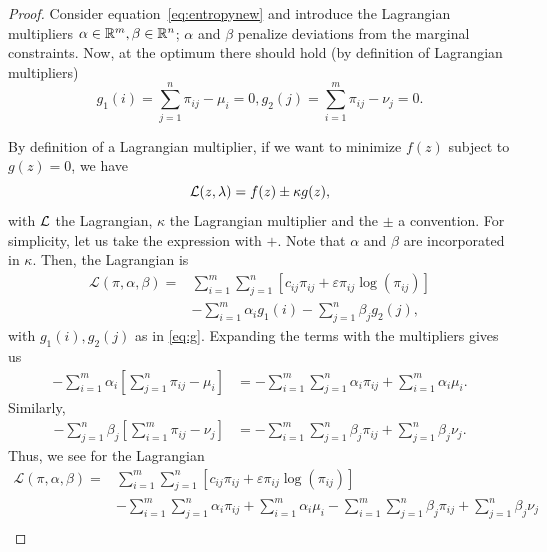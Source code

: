 \begin{proof}
	Consider equation~\eqref{eq:entropynew} and introduce the Lagrangian multipliers $\alpha \in \mathbb{R}^m, \beta\in \mathbb{R}^n$; $\alpha$ and $\beta$ penalize deviations from the marginal constraints. Now, at the optimum there should hold (by definition of Lagrangian multipliers)
	\begin{subequations}
		\begin{equation}
			g_1 (i) = \sum_{j=1}^n \pi_{ij} - \mu_i = 0,
		\end{equation}
		\begin{equation}
			g_2(j) =\sum_{i=1}^m \pi_{ij} - \nu_j = 0.
		\end{equation}
		\label{eq:g}
	\end{subequations}
	
	By definition of a Lagrangian multiplier, if we want to minimize $f(z)$ subject to $g(z) = 0$, we have 
	\begin{equation*}
		\mathcal{L}(z, \lambda) = f(z) \pm \kappa  g(z),
	\end{equation*}
	with $\mathcal{L}$ the Lagrangian, $\kappa$ the Lagrangian multiplier and the $\pm$ a convention. For simplicity, let us take the expression with $+$. Note that $\alpha$ and $\beta$ are incorporated in $\kappa$. Then, the Lagrangian is
	\begin{align*}
		\mathcal{L}(\pi, \alpha, \beta) = & \sum_{i=1}^m \sum_{j=1}^n \left[c_{ij} \pi_{ij} + \varepsilon \pi_{ij} \log(\pi_{ij})\right] \\
		& - \sum_{i=1}^m \alpha_i g_{1}(i) - \sum_{j=1}^n \beta_j g_{2}(j),
	\end{align*}
	with $g_{1}(i), g_{2}(j)$ as in \eqref{eq:g}. Expanding the terms with the multipliers gives us
	\begin{align*}
		- \sum_{i=1}^m \alpha_i \left[\sum_{j=1}^n \pi_{ij} - \mu_i \right] &= - \sum_{i=1}^m \sum_{j=1}^n \alpha_i \pi_{ij} + \sum_{i=1}^m \alpha_i \mu_i.
	\end{align*}
	Similarly,
	\begin{align*}
		- \sum_{j=1}^n \beta_j \left[\sum_{i=1}^m \pi_{ij} - \nu_j \right] &= - \sum_{i=1}^m \sum_{j=1}^n \beta_j \pi_{ij} + \sum_{j=1}^n \beta_j \nu_j.
	\end{align*}
	Thus, we see for the Lagrangian
	\begin{align}
		\mathcal{L}(\pi, \alpha, \beta) = & \sum_{i=1}^m \sum_{j=1}^n \left[c_{ij} \pi_{ij} + \varepsilon \pi_{ij} \log(\pi_{ij}) \right] \nonumber\\
		& - \sum_{i=1}^m \sum_{j=1}^n \alpha_i \pi_{ij} + \sum_{i=1}^m \alpha_i \mu_i  - \sum_{i=1}^m \sum_{j=1}^n \beta_j \pi_{ij} + \sum_{j=1}^n \beta_j \nu_j \nonumber \\

\end{align}
\end{proof}
